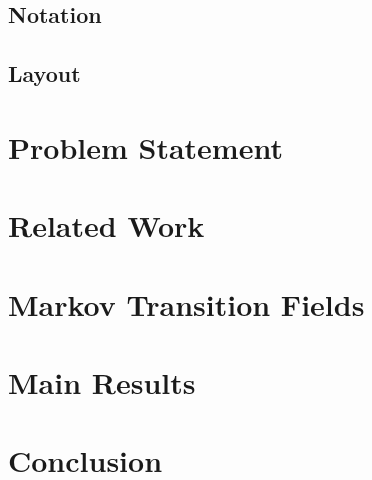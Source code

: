 \documentclass{turabian-thesis}
\begin{document}
\section{Notation}

\section{Layout}

\chapter{Problem Statement}


\chapter{Related Work}
 

\chapter{Markov Transition Fields}



\chapter{Main Results}

\chapter{Conclusion}
\label{chap:conclusion}


% 
%  
\end{document}
